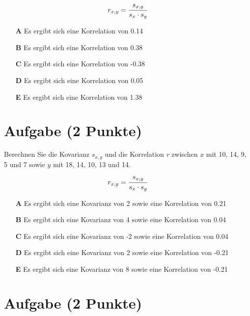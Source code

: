 \documentclass[a4paper, 10pt]{scrartcl}\usepackage[]{graphicx}\usepackage[]{xcolor}
\begin{document}
\begin{equation*}
  r_{x,y} = \cfrac{s_{x,y}}{s_x \cdot s_y}
\end{equation*}



\begin{enumerate}
\item [\textbf{A} \msquare] Es ergibt sich eine Korrelation von 0.14
\item [\textbf{B} \msquare] Es ergibt sich eine Korrelation von 0.38
\item [\textbf{C} \msquare] Es ergibt sich eine Korrelation von -0.38
\item [\textbf{D} \msquare] Es ergibt sich eine Korrelation von 0.05
\item [\textbf{E} \msquare] Es ergibt sich eine Korrelation von 1.38
\end{enumerate} 

\section{Aufgabe \hfill (2 Punkte)}




Berechnen Sie die Kovarianz $s_{x,y}$ und die Korrelation
\textit{r} zwischen $x$ mit 10, 14, 9, 5 und 7 sowie $y$ mit 18, 14, 10, 13 und 14.
\begin{equation*}
  r_{x,y} = \cfrac{s_{x,y}}{s_x \cdot s_y}
\end{equation*}



\begin{enumerate}
\item [\textbf{A} \msquare] Es ergibt sich eine Kovarianz von 2 sowie eine Korrelation von 0.21
\item [\textbf{B} \msquare] Es ergibt sich eine Kovarianz von 4 sowie eine Korrelation von 0.04
\item [\textbf{C} \msquare] Es ergibt sich eine Kovarianz von -2 sowie eine Korrelation von 0.04
\item [\textbf{D} \msquare] Es ergibt sich eine Kovarianz von 2 sowie eine Korrelation von -0.21
\item [\textbf{E} \msquare] Es ergibt sich eine Kovarianz von 8 sowie eine Korrelation von -0.21
\end{enumerate} 

\section{Aufgabe \hfill (2 Punkte)}
\end{document}
